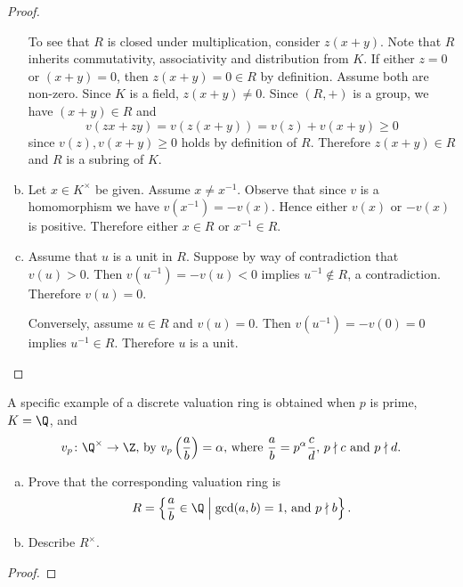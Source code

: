 \documentclass[10pt]{amsart}
\begin{document}
\begin{thm}
\begin{proof}
\begin{enumerate}[(a)]
      To see that $R$ is closed under multiplication, consider $z(x + y)$.
      Note that $R$ inherits commutativity, associativity and distribution from $K$.
      If either $z = 0$ or $(x+y) = 0$, then $z(x + y) = 0 \in R$ by definition.
      Assume both are non-zero.
      Since $K$ is a field, $z(x + y) \neq 0$.
      Since $(R, +)$ is a group, we have $(x + y) \in R$ and       
      $$v(zx + zy) = v(z(x+y)) = v(z) + v(x + y) \geq 0$$
      since $v(z), v(x + y) \geq 0$ holds by definition of $R$.
      Therefore $z(x + y) \in R$ and $R$ is a subring of $K$.
    \item
      Let $x \in K^\times$ be given.
      Assume $x \neq x^{-1}$.
      Observe that since $v$ is a homomorphism we have $v(x^{-1}) = -v(x)$.
      Hence either $v(x)$ or $-v(x)$ is positive.
      Therefore either $x \in R$ or $x^{-1} \in R$.
    \item
      Assume that $u$ is a unit in $R$.
      Suppose by way of contradiction that $v(u) > 0$.
      Then $v(u^{-1}) = -v(u) < 0$ implies $u^{-1} \not \in R$, a contradiction.
      Therefore $v(u) = 0$.
      
      Conversely, assume $u \in R$ and $v(u) = 0$.
      Then $v(u^{-1}) = -v(0) = 0$ implies $u^{-1} \in R$.
      Therefore $u$ is a unit.
    \end{enumerate}
  \end{proof}
\end{thm}

\begin{thm}
  A specific example of a discrete valuation ring is obtained when $p$ is prime, $K = \Q$, and 
  $$v_p \colon \Q^\times \rightarrow \Z,\, \text{by}\  v_p\left(\frac{a}{b}\right) = \alpha,\, \text{where}\  \frac{a}{b} = p^\alpha\frac{c}{d},\, p \nmid c\ \text{and}\ p \nmid d.$$
  \begin{enumerate}[(a)]
  \item
    Prove that the corresponding valuation ring is 
    $$R = \left\{\frac{a}{b} \in \Q \;\middle\vert\; \gcd(a,b) = 1,\, \text{and}\ p\nmid b\right\}.$$
  \item
    Describe $R^\times$.
  \end{enumerate}
  \begin{proof}
  \end{proof}
\end{thm}
\end{document}
